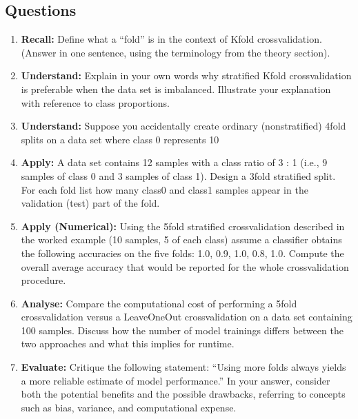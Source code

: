 \documentclass[12pt, a4paper]{article}
\begin{document}
\subsection*{Questions}
\begin{enumerate}
\item \textbf{Recall:} Define what a ``fold'' is in the context of Kfold crossvalidation.  (Answer in one sentence, using the terminology from the theory section). \newpage
\item \textbf{Understand:} Explain in your own words why stratified Kfold crossvalidation is preferable when the data set is imbalanced.  Illustrate your explanation with reference to class proportions. \newpage
\item \textbf{Understand:} Suppose you accidentally create ordinary (nonstratified) 4fold splits on a data set where class 0 represents 10 %
\item \textbf{Apply:} A data set contains 12 samples with a class ratio of 3 : 1 (i.e., 9 samples of class 0 and 3 samples of class 1).  Design a 3fold stratified split.  For each fold list how many class0 and class1 samples appear in the validation (test) part of the fold. \newpage
\item \textbf{Apply (Numerical):} Using the 5fold stratified crossvalidation described in the worked example (10 samples, 5 of each class) assume a classifier obtains the following accuracies on the five folds: 1.0, 0.9, 1.0, 0.8, 1.0.  Compute the overall average accuracy that would be reported for the whole crossvalidation procedure. \newpage
\item \textbf{Analyse:} Compare the computational cost of performing a 5fold crossvalidation versus a LeaveOneOut crossvalidation on a data set containing 100 samples.  Discuss how the number of model trainings differs between the two approaches and what this implies for runtime. \newpage
\item \textbf{Evaluate:} Critique the following statement: ``Using more folds always yields a more reliable estimate of model performance.''  In your answer, consider both the potential benefits and the possible drawbacks, referring to concepts such as bias, variance, and computational expense. \newpage
\end{enumerate}

\newpage
\end{document}
